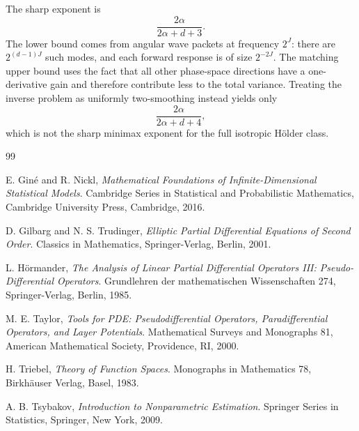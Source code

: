 \documentclass[11pt,a4paper]{article}
\theoremstyle{remark}
\numberwithin{equation}{section}
\begin{document}
The sharp exponent is
\[
\boxed{\frac{2\alpha}{2\alpha+d+3}}.
\]
The lower bound comes from angular wave packets at frequency $2^J$:
there are $2^{(d-1)J}$ such modes, and each forward response is of size
$2^{-2J}$. The matching upper bound uses the fact that all other
phase-space directions have a one-derivative gain and therefore contribute
less to the total variance. Treating the inverse problem as uniformly
two-smoothing instead yields only
\[
\frac{2\alpha}{2\alpha+d+4},
\]
which is not the sharp minimax exponent for the full isotropic H\"older
class.

\begin{thebibliography}{99}

E. Gin\'e and R. Nickl,
\emph{Mathematical Foundations of Infinite-Dimensional Statistical Models}.
Cambridge Series in Statistical and Probabilistic Mathematics,
Cambridge University Press, Cambridge, 2016.

D. Gilbarg and N. S. Trudinger,
\emph{Elliptic Partial Differential Equations of Second Order}.
Classics in Mathematics, Springer-Verlag, Berlin, 2001.

L. H\"ormander,
\emph{The Analysis of Linear Partial Differential Operators III:
Pseudo-Differential Operators}.
Grundlehren der mathematischen Wissenschaften 274,
Springer-Verlag, Berlin, 1985.

M. E. Taylor,
\emph{Tools for PDE: Pseudodifferential Operators, Paradifferential
Operators, and Layer Potentials}.
Mathematical Surveys and Monographs 81,
American Mathematical Society, Providence, RI, 2000.

H. Triebel,
\emph{Theory of Function Spaces}.
Monographs in Mathematics 78, Birkh\"auser Verlag, Basel, 1983.

A. B. Tsybakov,
\emph{Introduction to Nonparametric Estimation}.
Springer Series in Statistics, Springer, New York, 2009.

\end{thebibliography}
\end{document}
